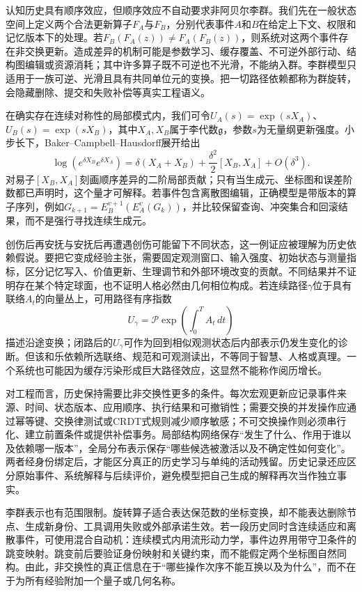认知历史具有顺序效应，但顺序效应不自动要求非阿贝尔李群。我们先在一般状态空间上定义两个合法更新算子$F_A$与$F_B$，分别代表事件$A$和$B$在给定上下文、权限和记忆版本下的处理。若$F_B(F_A(z))\neq F_A(F_B(z))$，则系统对这两个事件存在非交换更新。造成差异的机制可能是参数学习、缓存覆盖、不可逆外部行动、结构图编辑或资源消耗；其中许多算子既不可逆也不光滑，不能纳入群。李群模型只适用于一族可逆、光滑且具有共同单位元的变换。把一切路径依赖都称为群旋转，会隐藏删除、提交和失败补偿等真实工程语义。

在确实存在连续对称性的局部模式内，我们可令$U_A(s)=\exp(sX_A)$、$U_B(s)=\exp(sX_B)$，其中$X_A,X_B$属于李代数$\mathfrak g$，参数$s$为无量纲更新强度。小步长下，Baker--Campbell--Hausdorff展开给出
\begin{equation}
 \log\!\left(e^{\delta X_B}e^{\delta X_A}\right)
 =\delta(X_A+X_B)+\frac{\delta^2}{2}[X_B,X_A]+O(\delta^3).
\end{equation}
对易子$[X_B,X_A]$刻画顺序差异的二阶局部贡献；只有当生成元、坐标图和误差阶数都已声明时，这个量才可解释。若事件包含离散图编辑，正确模型是带版本的算子序列，例如$G_{k+1}=E_B^{v+1}(E_A^v(G_k))$，并比较保留查询、冲突集合和回滚结果，而不是强行寻找连续生成元。

创伤后再安抚与安抚后再遭遇创伤可能留下不同状态，这一例证应被理解为历史依赖假说。要把它变成经验主张，需要固定观测窗口、输入强度、初始状态与测量指标，区分记忆写入、价值更新、生理调节和外部环境改变的贡献。不同结果并不证明存在某个特定球面，也不证明人格必然由几何相位构成。若连续路径$\gamma$位于具有联络$A_t$的向量丛上，可用路径有序指数
\begin{equation}
 U_\gamma=\mathcal P\exp\!\left(\int_0^T A_t\,dt\right)
\end{equation}
描述沿途变换；闭路后的$U_\gamma$可作为回到相似观测状态后内部表示仍发生变化的诊断。但该和乐依赖所选联络、规范和可观测读出，不等同于智慧、人格或真理。一个系统也可能因为缓存污染形成巨大路径效应，这显然不能称作阅历增长。

对工程而言，历史保持需要比非交换性更多的条件。每次宏观更新应记录事件来源、时间、状态版本、应用顺序、执行结果和可撤销性；需要交换的并发操作应通过幂等键、交换律测试或CRDT式规则减少顺序敏感；不可交换操作则必须串行化、建立前置条件或提供补偿事务。局部结构网络保存“发生了什么、作用于谁以及依赖哪一版本”，全局分布表示保存“哪些候选被激活以及不确定性如何变化”。两者经身份绑定后，才能区分真正的历史学习与单纯的活动残留。历史记录还应区分原始事件、系统解释与后续评价，避免模型把自己生成的解释再次当作独立事实。

李群表示也有范围限制。旋转算子适合表达保范数的坐标变换，却不能表达删除节点、生成新身份、工具调用失败或外部承诺生效。若一段历史同时含连续适应和离散事件，可使用混合自动机：连续模式内用流形动力学，事件边界用带守卫条件的跳变映射。跳变前后要验证身份映射和关键约束，而不能假定两个坐标图自然同构。由此，非交换性的真正信息在于“哪些操作次序不能互换以及为什么”，而不在于为所有经验附加一个量子或几何名称。

